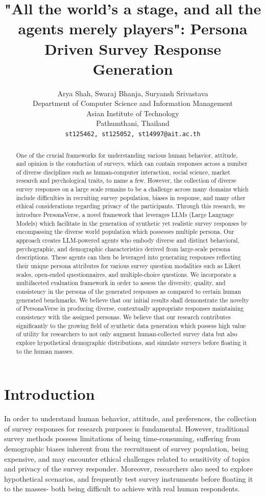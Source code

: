 \documentclass[11pt]{article}
\title{"All the world's a stage, and all the agents merely players": Persona Driven Survey Response Generation}
\author{Arya Shah, Swaraj Bhanja, Suryansh Srivastava \\
         Department of Computer Science and Information Management\\ Asian Institute of Technology \\ Pathumthani, Thailand \\ \texttt{{{st125462, st125052, st14997}@ait.ac.th}}}
\begin{document}
\maketitle
\begin{abstract}
One of the crucial frameworks for understanding various human behavior, attitude, and opinion is the conduction of surveys, which can contain responses across a number of diverse disciplines such as human-computer interaction, social science, market research and psychological traits, to name a few. However, the collection of diverse survey responses on a large scale remains to be a challenge across many domains which include difficulties in recruiting survey population, biases in response, and many other ethical considerations regarding privacy of the participants. Through this research, we introduce PersonaVerse, a novel framework that leverages LLMs (Large Language Models) which facilitate in the generation of synthetic yet realistic survey responses by encompassing the diverse world population which possesses multiple persona. Our approach creates LLM-powered agents who embody diverse and distinct behavioral, psychographic, and demographic characteristics derived from large-scale persona descriptions. These agents can then be leveraged into generating responses reflecting their unique persona attributes for various survey question modalities such as  Likert scales, open-ended questionnaires, and multiple-choice questions. We incorporate a multifaceted evaluation framework in order to assess the diversity, quality, and consistency in the persona of the generated responses as compared to certain human generated benchmarks. We believe that our initial results shall demonstrate the novelty of PersonaVerse in producing diverse, contextually appropriate responses maintaining consistency with the assigned personas. We believe that our research contributes significantly to the growing field of synthetic data generation which possess high value of utility for researchers to not only augment human-collected survey data but also explore hypothetical demographic distributions, and simulate surveys before floating it to the human masses.
\end{abstract}

\section{Introduction}

In order to understand human behavior,  attitude, and preferences, the collection of survey responses for research purposes is fundamental. However, traditional survey methods possess limitations of being time-consuming, suffering from demographic biases inherent from the recruitment of survey population, being expensive, and may encounter ethical challenges related to sensitivity of topics and privacy of the survey responder. Moreover, researchers also need to explore hypothetical scenarios, and frequently test survey instruments before floating it to the masses- both being difficult to achieve with real human respondents.
\end{document}
